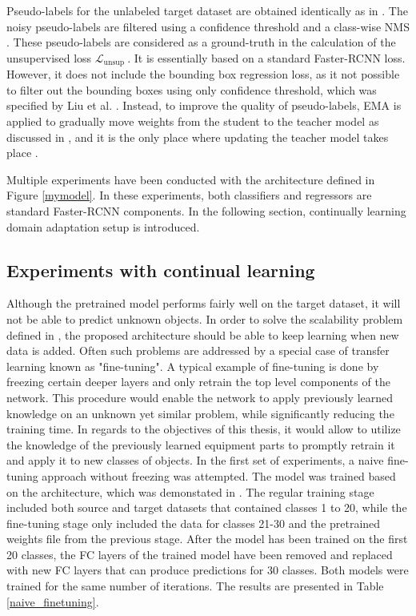 \documentclass[english, 12pt, a4paper, elec, utf8, a-1b, online]{aaltothesis}
\begin{document}
Pseudo-labels for the unlabeled target dataset are obtained identically as in \cite{Li2021}. The noisy pseudo-labels are filtered using a confidence threshold and a class-wise NMS \cite{Liu2021}. These pseudo-labels are considered as a ground-truth in the calculation of the unsupervised loss $\mathcal{L}_{\text {unsup }}$. It is essentially based on a standard Faster-RCNN loss. However, it does not include the bounding box regression loss, as it not possible to filter out the bounding boxes using only confidence threshold, which was specified by Liu et al. \cite{Liu2021}.  Instead, to improve the quality of pseudo-labels, EMA is applied to gradually move weights from the student to the teacher model as discussed in , and it is the only place where updating the teacher model takes place \cite{Li2021}.  
 
Multiple experiments have been conducted with the architecture defined in Figure \ref{mymodel}. In these experiments, both classifiers and regressors are standard Faster-RCNN components. In the following section, continually learning domain adaptation setup is introduced. 


\subsection{Experiments with continual learning}
\label{cont_learning_section} 
Although the pretrained model performs fairly well on the target dataset, it will not be able to predict unknown objects. In order to solve the scalability problem defined in , the proposed architecture should be able to keep learning when new data is added. Often such problems are addressed by a special case of transfer learning known as "fine-tuning". A typical example of fine-tuning is done by freezing certain deeper layers and only retrain the top level components of the network. This procedure would enable the network to apply previously learned knowledge on an unknown yet similar problem, while significantly reducing the training time. In regards to the objectives of this thesis, it would allow to utilize the knowledge of the previously learned equipment parts to promptly retrain it and apply it to new classes of objects. 
In the first set of experiments, a naive fine-tuning approach without freezing was attempted. The model was trained based on the architecture, which was demonstated in . The regular training stage included both source and target datasets that contained classes 1 to 20, while the fine-tuning stage only included the data for classes 21-30 and the pretrained weights file from the previous stage. After the model has been trained on the first 20 classes, the FC layers of the trained model have been removed and replaced with new FC layers that can produce predictions for 30 classes. Both models were trained for the same number of iterations. The results are presented in Table \ref{naive_finetuning}.
\end{document}
